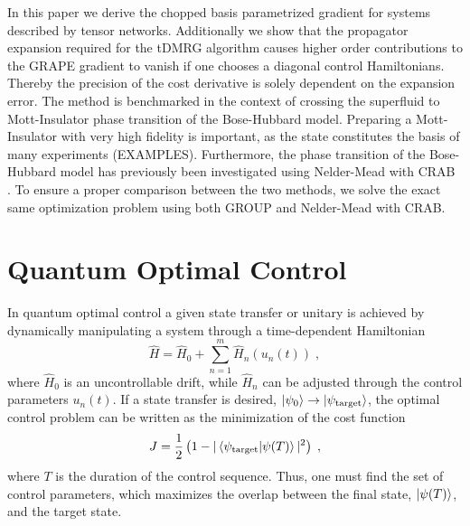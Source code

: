 \documentclass[%
 reprint,
 amsmath,amssymb,
 aps,
pra,
]{revtex4-1}
\begin{document}
In this paper we derive the chopped basis parametrized gradient for systems described by tensor networks. Additionally we show that the propagator expansion required for the tDMRG algorithm causes higher order contributions to the GRAPE gradient to vanish if one chooses a diagonal control Hamiltonians. Thereby the precision of the cost derivative is solely dependent on the expansion error.
The method is benchmarked in the context of crossing the superfluid to Mott-Insulator phase transition of the Bose-Hubbard model. Preparing a Mott-Insulator with very high fidelity is important, as the state constitutes the basis of many experiments (EXAMPLES). Furthermore, the phase transition of the Bose-Hubbard model has previously been investigated using Nelder-Mead with CRAB \cite{doria2011optimal,van2016optimal}.
To ensure a proper comparison between the two methods, we solve the exact same optimization problem using both GROUP and Nelder-Mead with CRAB.
   


\section{Quantum Optimal Control}
In quantum optimal control a given state transfer or unitary is achieved by dynamically manipulating a system through a time-dependent Hamiltonian
\begin{equation}
	\hat{H} =  \hat{H}_0 + \sum_{n = 1}^{m}  \hat{H}_n (u_n(t)) \; ,
	\label{eq:ControlHamiltonians}
\end{equation} 
where $\hat{H}_0$ is an uncontrollable drift, while $\hat{H}_n$ can be adjusted through the control parameters $u_n(t)$. If a state transfer is desired, $\ket{\psi_0} \to \ket{\psi_{\mathrm{target}}}$, the optimal control problem can be written as the minimization of the cost function
\begin{equation}
	J = \frac{1}{2} \left( 1-|\braket{\psi_{\mathrm{target}} | \psi (T)}|^2 \right) \; ,
	\label{eq:infidelityCost}
\end{equation}
where $T$ is the duration of the control sequence. Thus, one must find the set of control parameters, which maximizes the overlap between the final state, $\ket{\psi (T)}$, and the target state.
\end{document}
